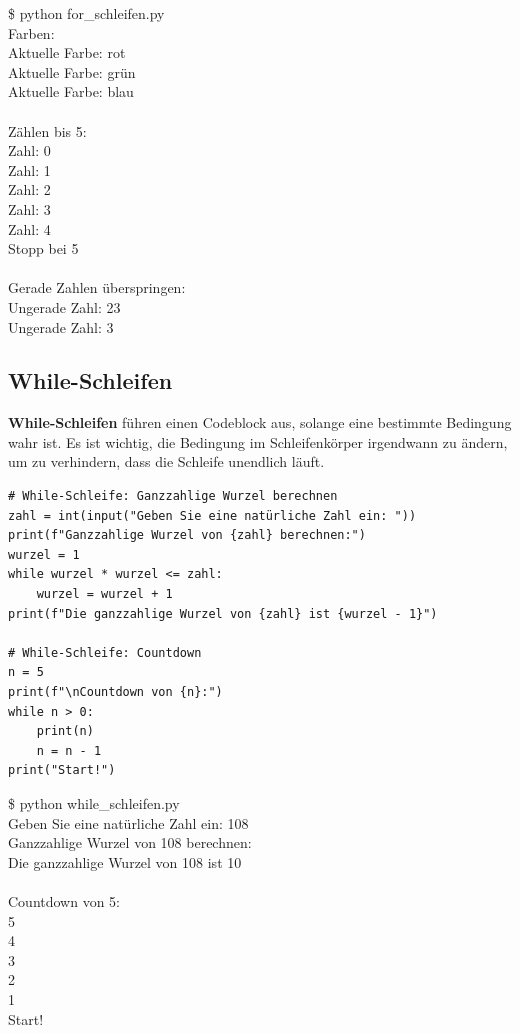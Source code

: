 \documentclass[ngerman,11pt]{article}
\begin{document}
\begin{tcolorbox}[colback=gray!15, fontupper=\ttfamily, boxrule=0.5pt,
    left=3mm, right=3mm, top=2mm, bottom=2mm]
\$ python for\_schleifen.py\\
Farben:\\
Aktuelle Farbe: rot\\
Aktuelle Farbe: grün\\
Aktuelle Farbe: blau\\
\\
Zählen bis 5:\\
Zahl: 0\\
Zahl: 1\\
Zahl: 2\\
Zahl: 3\\
Zahl: 4\\
Stopp bei 5\\
\\
Gerade Zahlen überspringen:\\
Ungerade Zahl: 23\\
Ungerade Zahl: 3
\end{tcolorbox}

\subsection{While-Schleifen}

\textbf{While-Schleifen} führen einen Codeblock aus, solange eine bestimmte Bedingung wahr ist. Es ist wichtig, die Bedingung im Schleifenkörper irgendwann zu ändern, um zu verhindern, dass die Schleife unendlich läuft.

\begin{lstlisting}[caption=while\_schleifen.py]
# While-Schleife: Ganzzahlige Wurzel berechnen
zahl = int(input("Geben Sie eine natürliche Zahl ein: "))
print(f"Ganzzahlige Wurzel von {zahl} berechnen:")
wurzel = 1
while wurzel * wurzel <= zahl:
    wurzel = wurzel + 1
print(f"Die ganzzahlige Wurzel von {zahl} ist {wurzel - 1}")

# While-Schleife: Countdown
n = 5
print(f"\nCountdown von {n}:")
while n > 0:
    print(n)
    n = n - 1
print("Start!")
\end{lstlisting}

\begin{tcolorbox}[colback=gray!15, fontupper=\ttfamily, boxrule=0.5pt,
    left=3mm, right=3mm, top=2mm, bottom=2mm]
\$ python while\_schleifen.py\\
Geben Sie eine natürliche Zahl ein: 108\\
Ganzzahlige Wurzel von 108 berechnen:\\
Die ganzzahlige Wurzel von 108 ist 10\\
\\
Countdown von 5:\\
5\\
4\\
3\\
2\\
1\\
Start!
\end{tcolorbox}
\end{document}
